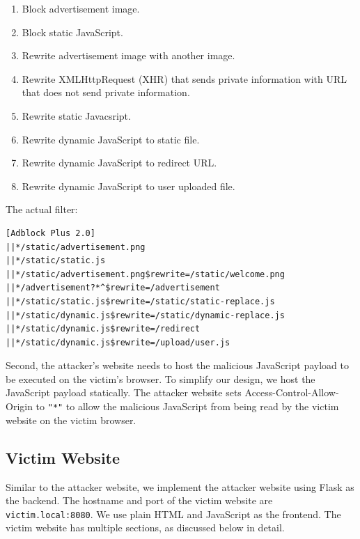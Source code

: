 \documentclass[conference]{IEEEtran}
\begin{document}
\begin{enumerate}
	\item Block advertisement image.
	\item Block static JavaScript.
	\item Rewrite advertisement image with another image.
	\item Rewrite XMLHttpRequest (XHR) that sends private information with URL that does not send private information.
	\item Rewrite static Javacsript.
	\item Rewrite dynamic JavaScript to static file.
	\item Rewrite dynamic JavaScript to redirect URL.
	\item Rewrite dynamic JavaScript to user uploaded file.
\end{enumerate}

The actual filter: 

\begin{lstlisting}
[Adblock Plus 2.0]
||*/static/advertisement.png
||*/static/static.js
||*/static/advertisement.png$rewrite=/static/welcome.png
||*/advertisement?*^$rewrite=/advertisement
||*/static/static.js$rewrite=/static/static-replace.js
||*/static/dynamic.js$rewrite=/static/dynamic-replace.js
||*/static/dynamic.js$rewrite=/redirect
||*/static/dynamic.js$rewrite=/upload/user.js
\end{lstlisting}

Second, the attacker's website needs to host the malicious JavaScript payload to be executed on the victim's browser. To simplify our design, we host the JavaScript payload statically. The attacker website sets Access-Control-Allow-Origin to \lstinline{"*"} to allow the malicious JavaScript from being read by the victim website on the victim browser.

\subsection{Victim Website}

Similar to the attacker website, we implement the attacker website using Flask as the backend. The hostname and port of the victim website are \lstinline{victim.local:8080}. We use plain HTML and JavaScript as the frontend. The victim website has multiple sections, as discussed below in detail.
\end{document}
